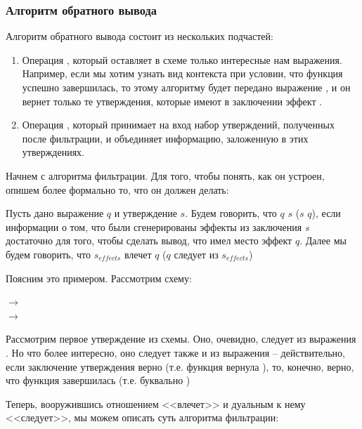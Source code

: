 \subsubsection{Алгоритм обратного вывода}

\label{section-back-inference}

Алгоритм обратного вывода состоит из нескольких подчастей:

\begin{enumerate}
    \item Операция , который оставляет в схеме только интересные нам выражения. Например, если мы хотим узнать вид контекста при условии, что функция успешно завершилась, то этому алгоритму будет передано выражение , и он вернет только те утверждения, которые имеют в заключении эффект .

    \item Операция , который принимает на вход набор утверждений, полученных после фильтрации, и объединяет информацию, заложенную в этих утверждениях.
\end{enumerate}

Начнем с алгоритма фильтрации. Для того, чтобы понять, как он устроен, опишем более формально то, что он должен делать:

\begin{definition}
    Пусть дано выражение $q$ и утверждение $s$. Будем говорить, что $q$  $s$ ($s$  $q$), если информации о том, что были сгенерированы эффекты из заключения $s$ достаточно для того, чтобы сделать вывод, что  имел место эффект $q$. Далее мы будем говорить, что $s_{effects}$ влечет $q$ ($q$ следует из $s_{effects}$)
\end{definition}

Поясним это примером. Рассмотрим схему:

{
     $\rightarrow$  \\
     $\rightarrow$ 
}{}

Рассмотрим первое утверждение из схемы. Оно, очевидно, следует из выражения . Но что более интересно, оно следует также и из выражения  -- действительно, если заключение утверждения верно (т.е. функция вернула ), то, конечно, верно, что функция завершилась (т.е. буквально )



Теперь, вооружившись отношением <<влечет>> и дуальным к нему <<следует>>, мы можем описать суть алгоритма фильтрации:

